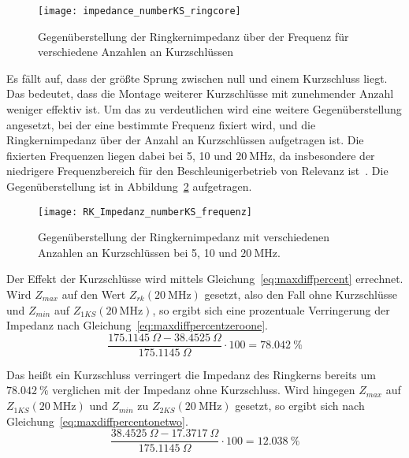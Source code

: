 \begin{figure}[htb]
	\centering
	\texttt{[image: impedance\_numberKS\_ringcore]}
	\caption{Gegen\"uberstellung der Ringkernimpedanz \"uber der Frequenz f\"ur verschiedene Anzahlen an Kurzschl\"ussen}
	\label{fig:ringcorenumber}
\end{figure}
\par
Es f\"allt auf, dass der gr\"o\ss{}te Sprung zwischen null und einem Kurzschluss liegt. Das bedeutet, dass die Montage weiterer Kurzschl\"usse mit zunehmender Anzahl weniger effektiv ist. Um das zu verdeutlichen wird eine weitere Gegen\"uberstellung angesetzt, bei der eine bestimmte Frequenz fixiert wird, und die Ringkernimpedanz \"uber der Anzahl an Kurzschl\"ussen aufgetragen ist. Die fixierten Frequenzen liegen dabei bei 5, 10 und $\SI{20}{\mega\hertz}$, da insbesondere der niedrigere Frequenzbereich f\"ur den Beschleunigerbetrieb von Relevanz ist~\citep{frey2015status}. Die Gegen\"uberstellung ist in Abbildung~\ref{fig:ringcorenumber20} aufgetragen.
\begin{figure}[htb]
	\centering
	\texttt{[image: RK\_Impedanz\_numberKS\_frequenz]}
	\caption{Gegen\"uberstellung der Ringkernimpedanz mit verschiedenen Anzahlen an Kurzschl\"ussen bei 5, 10 und $\SI{20}{\mega\hertz}$.}
	\label{fig:ringcorenumber20}
\end{figure}
\par
Der Effekt der Kurzschl\"usse wird mittels Gleichung~\ref{eq:maxdiffpercent} errechnet. Wird $Z_{max}$ auf den Wert $Z_{rk}(\SI{20}{\mega\hertz})$ gesetzt, also den Fall ohne Kurzschl\"usse und $Z_{min}$ auf $Z_{1KS}(\SI{20}{\mega\hertz})$, so ergibt sich eine prozentuale Verringerung der Impedanz nach Gleichung~\ref{eq:maxdiffpercentzeroone}.
\begin{equation}
	\frac{\SI{175,1145}{\Omega} - \SI{38,4525}{\Omega}}{\SI{175,1145}{\Omega}}\cdot 100 = \SI{78,042}{\%}
	\label{eq:maxdiffpercentzeroone}
\end{equation}
\par
Das hei\ss{}t ein Kurzschluss verringert die Impedanz des Ringkerns bereits um $\SI{78,042}{\%}$ verglichen mit der Impedanz ohne Kurzschluss. Wird hingegen $Z_{max}$ auf $Z_{1KS}(\SI{20}{\mega\hertz})$ und $Z_{min}$ zu $Z_{2KS}(\SI{20}{\mega\hertz})$ gesetzt, so ergibt sich nach Gleichung~\ref{eq:maxdiffpercentonetwo}.
\begin{equation}
	\frac{\SI{38,4525}{\Omega} - \SI{17,3717}{\Omega}}{\SI{175,1145}{\Omega}}\cdot 100 = \SI{12,038}{\%}
	\label{eq:maxdiffpercentonetwo}
\end{equation}
